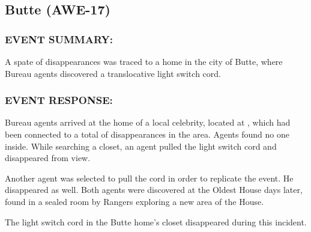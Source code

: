 \subsection*{Butte (AWE-17)}
\subsubsection*{EVENT SUMMARY:}
\par A spate of disappearances was traced to a home in the city of
Butte, where Bureau agents discovered a translocative light
switch cord.
\subsubsection*{EVENT RESPONSE:}
\par Bureau agents arrived at the home of a local celebrity, located at  , which had been connected to a total of  disappearances in the area. Agents
 found no one inside. While searching a closet, an agent pulled
the light switch cord and disappeared from view.
\par Another agent was selected to pull the cord in order to replicate
the event. He disappeared as well. Both agents were discovered
at the Oldest House  days later, found in a sealed room by
Rangers exploring a new area of the House.
\par The light switch cord in the Butte home's closet disappeared
during this incident.